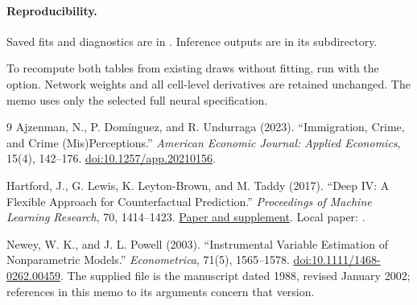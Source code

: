 \paragraph{Reproducibility.}
Saved fits and diagnostics are in . Inference outputs are in its  subdirectory.

To recompute both tables from existing draws without fitting, run  with the  option. Network weights and all cell-level derivatives are retained unchanged. The memo uses only the selected full neural specification.

\begin{thebibliography}{9}
Ajzenman, N., P. Dom\'{i}nguez, and R. Undurraga (2023).
``Immigration, Crime, and Crime (Mis)Perceptions.''
\emph{American Economic Journal: Applied Economics}, 15(4), 142--176.
\href{https://doi.org/10.1257/app.20210156}{doi:10.1257/app.20210156}.

Hartford, J., G. Lewis, K. Leyton-Brown, and M. Taddy (2017).
``Deep IV: A Flexible Approach for Counterfactual Prediction.''
\emph{Proceedings of Machine Learning Research}, 70, 1414--1423.
\href{https://proceedings.mlr.press/v70/hartford17a.html}{Paper and supplement}.
Local paper: .

Newey, W. K., and J. L. Powell (2003).
``Instrumental Variable Estimation of Nonparametric Models.''
\emph{Econometrica}, 71(5), 1565--1578.
\href{https://doi.org/10.1111/1468-0262.00459}{doi:10.1111/1468-0262.00459}.
The supplied file  is the manuscript dated 1988, revised January 2002; references in this memo to its arguments concern that version.
\end{thebibliography}
